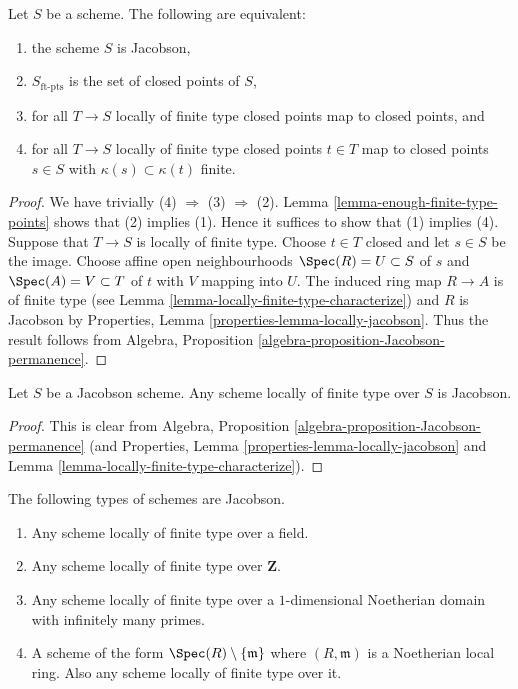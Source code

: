 \begin{lemma}
\label{lemma-jacobson-finite-type-points}
Let $S$ be a scheme. The following are equivalent:
\begin{enumerate}
\item the scheme $S$ is Jacobson,
\item $S_{\text{ft-pts}}$ is the set of closed points of $S$,
\item for all $T \to S$ locally of finite type
closed points map to closed points, and
\item for all $T \to S$ locally of finite type
closed points $t \in T$ map to closed points $s \in S$ with
$\kappa(s) \subset \kappa(t)$ finite.
\end{enumerate}
\end{lemma}

\begin{proof}
We have trivially (4) $\Rightarrow$ (3) $\Rightarrow$ (2).
Lemma \ref{lemma-enough-finite-type-points} shows that (2) implies (1).
Hence it suffices to show that (1) implies (4).
Suppose that $T \to S$ is locally of finite type.
Choose $t \in T$ closed and let $s \in S$ be the image.
Choose affine open neighbourhoods $\Spec(R) = U \subset S$ of $s$ and
$\Spec(A) = V \subset T$ of $t$ with $V$ mapping into $U$.
The induced ring map $R \to A$ is of finite type
(see Lemma \ref{lemma-locally-finite-type-characterize}) and $R$ is Jacobson
by Properties, Lemma \ref{properties-lemma-locally-jacobson}.
Thus the result follows from
Algebra, Proposition \ref{algebra-proposition-Jacobson-permanence}.
\end{proof}

\begin{lemma}
\label{lemma-Jacobson-universally-Jacobson}
Let $S$ be a Jacobson scheme.
Any scheme locally of finite type over $S$ is Jacobson.
\end{lemma}

\begin{proof}
This is clear from
Algebra, Proposition \ref{algebra-proposition-Jacobson-permanence}
(and Properties, Lemma \ref{properties-lemma-locally-jacobson} and
Lemma \ref{lemma-locally-finite-type-characterize}).
\end{proof}

\begin{lemma}
\label{lemma-ubiquity-Jacobson-schemes}
The following types of schemes are Jacobson.
\begin{enumerate}
\item Any scheme locally of finite type over a field.
\item Any scheme locally of finite type over $\mathbf{Z}$.
\item Any scheme locally of finite type over a $1$-dimensional
Noetherian domain with infinitely many primes.
\item A scheme of the form $\Spec(R) \setminus \{\mathfrak m\}$
where $(R, \mathfrak m)$ is a Noetherian local ring.
Also any scheme locally of finite type over it.
\end{enumerate}
\end{lemma}

